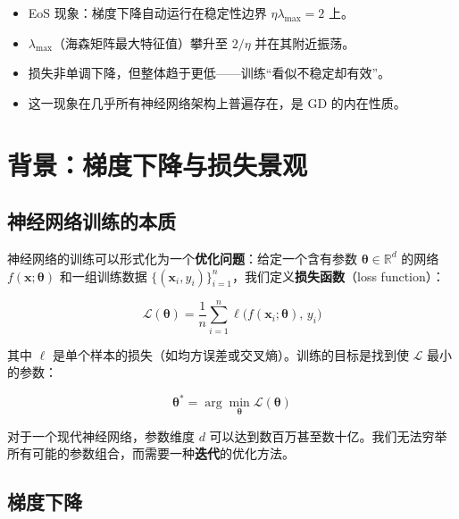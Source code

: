 \documentclass[11pt,a4paper]{ctexart}
\newcommand{\lmax}{\lambda_{\max}}
\newcommand{\Loss}{\mathcal{L}}
\begin{document}
\begin{secnote}
\begin{itemize}[leftmargin=1.5em, itemsep=2pt]
  \item EoS 现象：梯度下降自动运行在稳定性边界 $\eta\lmax = 2$ 上。
  \item $\lmax$（海森矩阵最大特征值）攀升至 $2/\eta$ 并在其附近振荡。
  \item 损失非单调下降，但整体趋于更低——训练``看似不稳定却有效''。
  \item 这一现象在几乎所有神经网络架构上普遍存在，是 GD 的内在性质。
\end{itemize}
\end{secnote}

\section{背景：梯度下降与损失景观}\label{sec:bg}

\subsection{神经网络训练的本质}

神经网络的训练可以形式化为一个\textbf{优化问题}：给定一个含有参数 $\boldsymbol{\theta} \in \mathbb{R}^d$ 的网络 $f(\mathbf{x}; \boldsymbol{\theta})$ 和一组训练数据 $\{(\mathbf{x}_i, y_i)\}_{i=1}^n$，我们定义\textbf{损失函数}（loss function）：

\begin{equation}\label{eq:loss}
  \Loss(\boldsymbol{\theta}) = \frac{1}{n} \sum_{i=1}^n \ell\bigl(f(\mathbf{x}_i; \boldsymbol{\theta}),\, y_i\bigr)
\end{equation}

其中 $\ell$ 是单个样本的损失（如均方误差或交叉熵）。训练的目标是找到使 $\Loss$ 最小的参数：

\begin{equation}
  \boldsymbol{\theta}^* = \arg\min_{\boldsymbol{\theta}} \Loss(\boldsymbol{\theta})
\end{equation}

对于一个现代神经网络，参数维度 $d$ 可以达到数百万甚至数十亿。我们无法穷举所有可能的参数组合，而需要一种\textbf{迭代}的优化方法。

\subsection{梯度下降}
\end{document}
